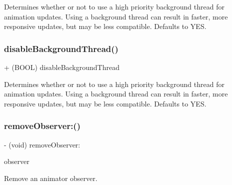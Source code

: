 Determines whether or not to use a high priority background thread for animation updates. Using a background thread can result in faster, more responsive updates, but may be less compatible. Defaults to Y\+ES. \mbox{\label{interface_p_o_p_animator_a4c3d7e7c7d6bef1865ae24f49c69615b}} 
\subsubsection{\texorpdfstring{disable\+Background\+Thread()}{disableBackgroundThread()}\hspace{0.1cm}{\footnotesize\ttfamily [2/2]}}
{\footnotesize\ttfamily + (B\+O\+OL) disable\+Background\+Thread \begin{DoxyParamCaption}{ }\end{DoxyParamCaption}\hspace{0.3cm}{\ttfamily [implementation]}}

Determines whether or not to use a high priority background thread for animation updates. Using a background thread can result in faster, more responsive updates, but may be less compatible. Defaults to Y\+ES. \mbox{\label{interface_p_o_p_animator_adc71ca908923f51bfab999a4e0beeb76}} 
\subsubsection{\texorpdfstring{remove\+Observer\+:()}{removeObserver:()}\hspace{0.1cm}{\footnotesize\ttfamily [1/2]}}
{\footnotesize\ttfamily -\/ (void) remove\+Observer\+: \begin{DoxyParamCaption}\item[{(id$<$ P\+O\+P\+Animator\+Observing $>$)}]{observer }\end{DoxyParamCaption}\hspace{0.3cm}{\ttfamily [implementation]}}

Remove an animator observer. \mbox{\label{interface_p_o_p_animator_adc71ca908923f51bfab999a4e0beeb76}} 
